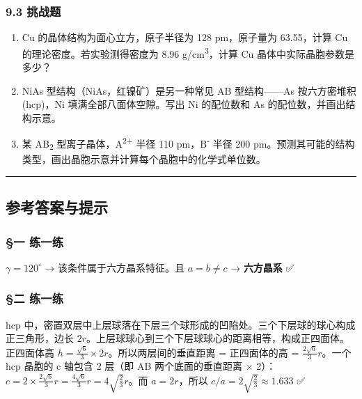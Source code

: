 \documentclass[a4paper,11pt]{ctexart}
\providecommand{\tightlist}{\setlength{\itemsep}{0pt}\setlength{\parskip}{0pt}}
\begin{document}
\subsubsection{9.3 挑战题}\label{ux6311ux6218ux9898}

\begin{enumerate}
\def\labelenumi{\arabic{enumi}.}
\setcounter{enumi}{12}
\tightlist
\item
  Cu 的晶体结构为面心立方，原子半径为 128 pm，原子量为 63.55，计算 Cu 的理论密度。若实验测得密度为 8.96 g/cm\textsuperscript{3}，计算 Cu 晶体中实际晶胞参数是多少？
\item
  NiAs 型结构（NiAs，红镍矿）是另一种常见 AB 型结构------As 按六方密堆积(hcp)，Ni 填满全部八面体空隙。写出 Ni 的配位数和 As 的配位数，并画出结构示意。
\item
  某 AB\textsubscript{2} 型离子晶体，A\textsuperscript{2+} 半径 110 pm，B\textsuperscript{-} 半径 200 pm。预测其可能的结构类型，画出晶胞示意并计算每个晶胞中的化学式单位数。
\end{enumerate}

\begin{center}\rule{0.5\linewidth}{0.5pt}\end{center}

\subsection{参考答案与提示}\label{ux53c2ux8003ux7b54ux6848ux4e0eux63d0ux793a}

\subsubsection{§一 练一练}\label{ux4e00-ux7ec3ux4e00ux7ec3}

\(\gamma = 120^\circ\) → 该条件属于六方晶系特征。且 \(a = b \neq c\) → \textbf{六方晶系} ✅

\subsubsection{§二 练一练}\label{ux4e8c-ux7ec3ux4e00ux7ec3}

hcp 中，密置双层中上层球落在下层三个球形成的凹陷处。三个下层球的球心构成正三角形，边长 \(2r\)。上层球球心到三个下层球球心的距离相等，构成正四面体。正四面体高 \(h = \frac{\sqrt{6}}{3} \times 2r\)。所以两层间的垂直距离 = 正四面体的高 = \(\frac{2\sqrt{6}}{3}r\)。一个 hcp 晶胞的 c 轴包含 2 层（即 AB 两个底面的垂直距离 × 2）：\(c = 2 \times \frac{2\sqrt{6}}{3}r = \frac{4\sqrt{6}}{3}r = 4\sqrt{\frac{2}{3}}r\)。而 \(a = 2r\)，所以 \(c/a = 2\sqrt{\frac{2}{3}} \approx 1.633\) ✅
\end{document}
